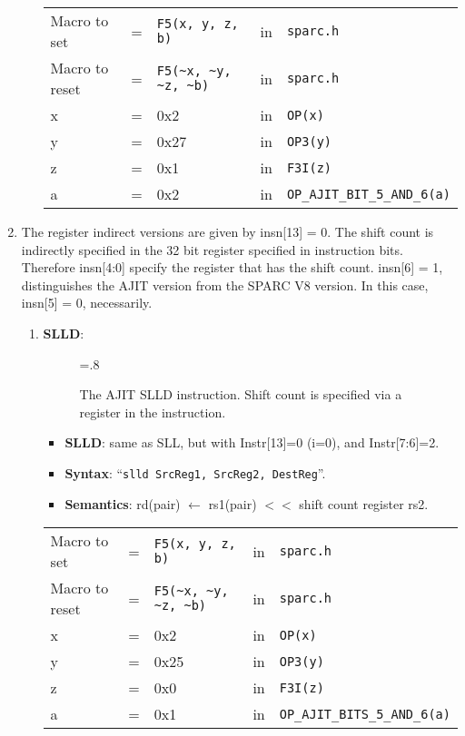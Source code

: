 \begin{enumerate}
\begin{enumerate}
    \begin{tabular}[h]{lclcl}
      Macro to set   &=&  \verb|F5(x, y, z, b)|     &in& \verb|sparc.h|  \\
      Macro to reset &=&  \verb|F5(~x, ~y, ~z, ~b)| &in& \verb|sparc.h|  \\
      x              &=& 0x2                        &in& \verb|OP(x)|    \\
      y              &=& 0x27                       &in& \verb|OP3(y)|   \\
      z              &=& 0x1                        &in& \verb|F3I(z)|   \\
      a              &=& 0x2                        &in& \verb|OP_AJIT_BIT_5_AND_6(a)|
    \end{tabular}
  \end{enumerate}
\item The register  indirect versions are given by insn[13]  = 0.  The
  shift count is indirectly specified in the 32 bit register specified
  in instruction bits.  Therefore  insn[4:0] specify the register that
  has the  shift count.  insn[6]  = 1, distinguishes the  AJIT version
  from the SPARC V8 version.  In this case, insn[5] = 0, necessarily.
  \begin{enumerate}
  \item \textbf{SLLD}:\\
    \begin{center}
      \begin{figure}[h]
        \centering
        \epsfxsize=.8\linewidth
        \caption{The AJIT SLLD instruction.   Shift count is specified
          via a register in the instruction.}
        \label{fig:ajit:slldcc:insn}
      \end{figure}
    \end{center}
    \begin{itemize}
    \item []\textbf{SLLD}: same as SLL, but with Instr[13]=0 (i=0),
      and Instr[7:6]=2.
    \item []\textbf{Syntax}: ``\texttt{slld SrcReg1, SrcReg2,
        DestReg}''.
    \item []\textbf{Semantics}: rd(pair) $\leftarrow$ rs1(pair) $<<$
      shift count register rs2.
    \end{itemize}

    \begin{tabular}[h]{lclcl}
      Macro to set   &=&  \verb|F5(x, y, z, b)|     &in& \verb|sparc.h|     \\
      Macro to reset &=&  \verb|F5(~x, ~y, ~z, ~b)| &in& \verb|sparc.h|     \\
      x &=& 0x2      &in& \verb|OP(x)| \\
      y &=& 0x25     &in& \verb|OP3(y)| \\
      z &=& 0x0      &in& \verb|F3I(z)| \\
      a &=& 0x1      &in& \verb|OP_AJIT_BITS_5_AND_6(a)|
    \end{tabular}


\end{enumerate}
\end{enumerate}
